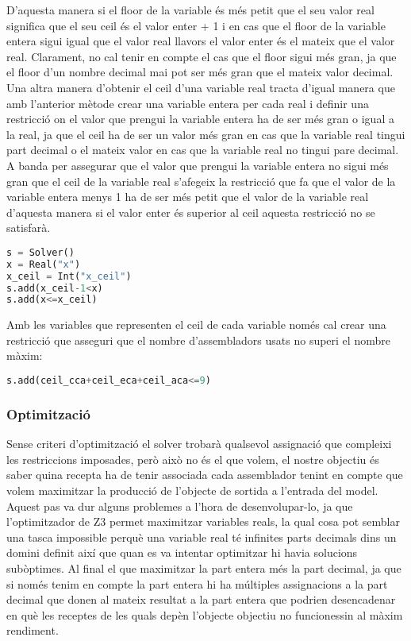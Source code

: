 D'aquesta manera si el floor de la variable és més petit que el seu valor real significa que el seu ceil és el valor enter + 1 i en cas que el floor de la variable entera sigui igual que el valor real llavors el valor enter és el mateix que el valor real. Clarament, no cal tenir en compte el cas que el floor sigui més gran, ja que el floor d'un nombre decimal mai pot ser més gran que el mateix valor decimal.\\

Una altra manera d'obtenir el ceil d'una variable real tracta d'igual manera que amb l'anterior mètode crear una variable entera per cada real i definir una restricció on el valor que prengui la variable entera ha de ser més gran o igual a la real, ja que el ceil ha de ser un valor més gran en cas que la variable real tingui part decimal o el mateix valor en cas que la variable real no tingui pare decimal. A banda per assegurar que el valor que prengui la variable entera no sigui més gran que el ceil de la variable real s'afegeix la restricció que fa que el valor de la variable entera menys 1 ha de ser més petit que el valor de la variable real d'aquesta manera si el valor enter és superior al ceil aquesta restricció no se satisfarà.

\begin{lstlisting}[language=Python, caption=Ceil implementation 2]
s = Solver()
x = Real("x")
x_ceil = Int("x_ceil")
s.add(x_ceil-1<x)
s.add(x<=x_ceil)
\end{lstlisting}

Amb les variables que representen el ceil de cada variable només cal crear una restricció que asseguri que el nombre d'assembladors usats no superi el nombre màxim:

\begin{lstlisting}[language=Python, caption=Limit assemblers]
s.add(ceil_cca+ceil_eca+ceil_aca<=9)
\end{lstlisting}

\subsubsection{Optimització}
Sense criteri d'optimització el solver trobarà qualsevol assignació que compleixi les restriccions imposades, però això no és el que volem, el nostre objectiu és saber quina recepta ha de tenir associada cada assemblador tenint en compte que volem maximitzar la producció de l'objecte de sortida a l'entrada del model. Aquest pas va dur alguns problemes a l'hora de desenvolupar-lo, ja que l'optimitzador de Z3 permet maximitzar variables reals, la qual cosa pot semblar una tasca impossible perquè una variable real té infinites parts decimals dins un domini definit així que quan es va intentar optimitzar hi havia solucions subòptimes. Al final el que  maximitzar la part entera més la part decimal, ja que si només tenim en compte la part entera hi ha múltiples assignacions a la part decimal que donen al mateix resultat a la part entera que podrien desencadenar en què les receptes de les quals depèn l'objecte objectiu no funcionessin al màxim rendiment.


